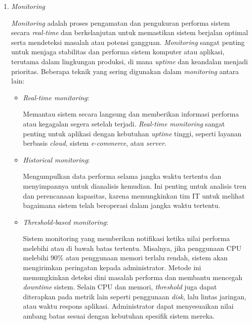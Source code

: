 \documentclass[12pt]{article}
\begin{document}
\begin{enumerate}
\begin{enumerate}
            \item \textit{Monitoring}
            \par \textit{Monitoring} adalah proses pengamatan dan pengukuran performa sistem secara \textit{real-time} dan berkelanjutan untuk memastikan sistem berjalan optimal serta mendeteksi masalah atau potensi gangguan. \textit{Monitoring} sangat penting untuk menjaga stabilitas dan performa sistem komputer atau aplikasi, terutama dalam lingkungan produksi, di mana \textit{uptime} dan keandalan menjadi prioritas. Beberapa teknik yang sering digunakan dalam \textit{monitoring} antara lain:
            \begin{itemize}
                \item \textit{Real-time monitoring}:
                \par Memantau sistem secara langsung dan memberikan informasi performa atau kegagalan segera setelah terjadi. \textit{Real-time monitoring} sangat penting untuk aplikasi dengan kebutuhan \textit{uptime} tinggi, seperti layanan berbasis \textit{cloud}, sistem \textit{e-commerce}, atau \textit{server}.
                \item \textit{Historical monitoring}:
                \par Mengumpulkan data performa selama jangka waktu tertentu dan menyimpannya untuk dianalisis kemudian. Ini penting untuk analisis tren dan perencanaan kapasitas, karena memungkinkan tim IT untuk melihat bagaimana sistem telah beroperasi dalam jangka waktu tertentu.
                \item \textit{Threshold-based monitoring}:
                \par Sistem monitoring yang memberikan notifikasi ketika nilai performa melebihi atau di bawah batas tertentu. Misalnya, jika penggunaan CPU melebihi 90\% atau penggunaan memori terlalu rendah, sistem akan mengirimkan peringatan kepada administrator. Metode ini memungkinkan deteksi dini masalah performa dan membantu mencegah \textit{downtime} sistem. Selain CPU dan memori, \textit{threshold} juga dapat diterapkan pada metrik lain seperti penggunaan \textit{disk}, lalu lintas jaringan, atau waktu respons aplikasi. Administrator dapat menyesuaikan nilai ambang batas sesuai dengan kebutuhan spesifik sistem mereka.
            \end{itemize}
            

\end{enumerate}
\end{enumerate}
\end{document}
